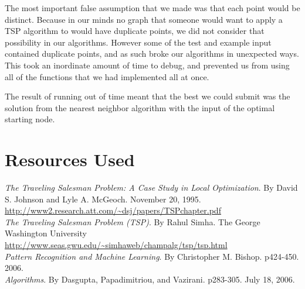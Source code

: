 \documentclass[12pt]{article}
\begin{document}
The most important false assumption that we made was that each point would be
distinct.  Because in our minds no graph that someone would want to apply a TSP
algorithm to would have duplicate points, we did not consider that possibility
in our algorithms.  However some of the test and example input contained
duplicate points, and as such broke our algorithms in unexpected ways.  This
took an inordinate amount of time to debug, and prevented us from using all of
the functions that we had implemented all at once.

The result of running out of time meant that the best we could submit was the
solution from the nearest neighbor algorithm with the input of the optimal
starting node.

\section*{Resources Used}

\emph{The Traveling Salesman Problem: A Case Study in Local Optimization}.  By
David S. Johnson and Lyle A. McGeoch. November 20, 1995.
\url{http://www2.research.att.com/~dsj/papers/TSPchapter.pdf}\\

\emph{The Traveling Salesman Problem (TSP)}.  By Rahul Simha. The George
Washington University
\url{http://www.seas.gwu.edu/~simhaweb/champalg/tsp/tsp.html}\\

\emph{Pattern Recognition and Machine Learning}. By Christopher M. Bishop.
p424-450. 2006.\\

\emph{Algorithms}. By Dasgupta, Papadimitriou, and Vazirani. p283-305. July 18,
2006.
\end{document}

